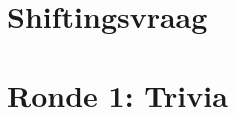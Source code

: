 \section{Shiftingsvraag}

\enspace\hrulefill


\section{Ronde 1: Trivia}
\begin{questions}

\question[2] \enspace\hrulefill
\vspace{5mm}
\question[2] \enspace\hrulefill
\vspace{5mm}
\question[2] \enspace\hrulefill
\vspace{5mm}
\question[2] \enspace\hrulefill
\vspace{5mm}
\question[2] \enspace\hrulefill
\vspace{5mm}
\question[2] \enspace\hrulefill
\vspace{5mm}
\question[2] \enspace\hrulefill
\vspace{5mm}
\question[2] \enspace\hrulefill
\vspace{5mm}
\question[2] \enspace\hrulefill
\vspace{5mm}
\question[2] \enspace\hrulefill

\end{questions}

\newpage
